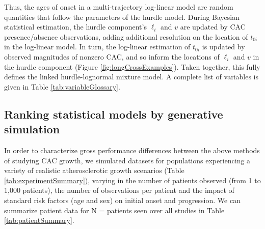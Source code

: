 \documentclass[aps,pre,twocolumn,twoside,tightenlines,groupedaddress,amsmath,amssymb,nobibnotes,final,showkeys,letterpaper]{revtex4-2}
\begin{document}
\begin{figure*}[t]
  \centering
  
  \caption{Observed CAC trajectories for 5 longitudinal study patients (left) and 40 cross-sectional patients (right), with average counterfactual predictions from fitted ln(CAC\,$|$\,CAC\,$>$\,0) (black), ln(CAC\,$+$\,1) (red) and linked hurdle-lognormal (blue) models. In each figure, the true population average $t_0$ is indicated by a black triangle. All statistical models are fit in R and Stan, with prior uncertainty equal to simulation uncertainty. Reproducible R code for this simulation and figure is available in the Supplementary Materials.}
  \label{fig:longCrossExamples}
\end{figure*}

Thus, the ages of onset in a multi-trajectory log-linear model are random quantities that follow the parameters of the hurdle model. During Bayesian statistical estimation, the hurdle component's $\ell_i$ and $v$ are updated by CAC presence/absence observations, adding additional resolution on the location of $t_{0i}$ in the log-linear model. In turn, the log-linear estimation of $t_{0i}$ is updated by observed magnitudes of nonzero CAC, and so inform the locations of $\ell_i$ and $v$ in the hurdle component (Figure \ref{fig:longCrossExamples}). Taken together, this fully defines the linked hurdle-lognormal mixture model. A complete list of variables is given in Table \ref{tab:variableGlossary}.

\subsection*{Ranking statistical models by generative simulation}

In order to characterize gross performance differences between the above methods of studying CAC growth, we simulated \numStudies{} datasets for populations experiencing a variety of realistic atherosclerotic growth scenarios (Table \ref{tab:experimentSummary}), varying in the number of patients observed (from 1 to 1,000 patients), the number of observations per patient and the impact of standard risk factors (age and sex) on initial onset and progression. We can summarize patient data for N = \numPatients{} patients seen over all \numStudies{} studies in Table \ref{tab:patientSummary}.
\end{document}
